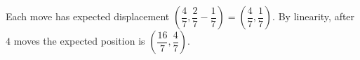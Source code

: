 Each move has expected displacement $\left(\dfrac47,\dfrac27-\dfrac17\right)=\left(\dfrac47,\dfrac17\right)$. By linearity, after $4$ moves the expected position is $\boxed{\left(\dfrac{16}7,\dfrac47\right)}$.
